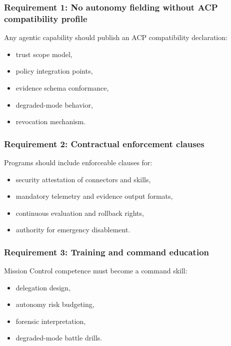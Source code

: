 \documentclass[
]{article}
\providecommand{\tightlist}{%
  \setlength{\itemsep}{0pt}\setlength{\parskip}{0pt}}
\begin{document}
\hypertarget{requirement-1-no-autonomy-fielding-without-acp-compatibility-profile}{%
\subsubsection{Requirement 1: No autonomy fielding without ACP
compatibility
profile}\label{requirement-1-no-autonomy-fielding-without-acp-compatibility-profile}}

Any agentic capability should publish an ACP compatibility declaration:

\begin{itemize}
\tightlist
\item
  trust scope model,
\item
  policy integration points,
\item
  evidence schema conformance,
\item
  degraded-mode behavior,
\item
  revocation mechanism.
\end{itemize}

\hypertarget{requirement-2-contractual-enforcement-clauses}{%
\subsubsection{Requirement 2: Contractual enforcement
clauses}\label{requirement-2-contractual-enforcement-clauses}}

Programs should include enforceable clauses for:

\begin{itemize}
\tightlist
\item
  security attestation of connectors and skills,
\item
  mandatory telemetry and evidence output formats,
\item
  continuous evaluation and rollback rights,
\item
  authority for emergency disablement.
\end{itemize}

\hypertarget{requirement-3-training-and-command-education}{%
\subsubsection{Requirement 3: Training and command
education}\label{requirement-3-training-and-command-education}}

Mission Control competence must become a command skill:

\begin{itemize}
\tightlist
\item
  delegation design,
\item
  autonomy risk budgeting,
\item
  forensic interpretation,
\item
  degraded-mode battle drills.
\end{itemize}
\end{document}
